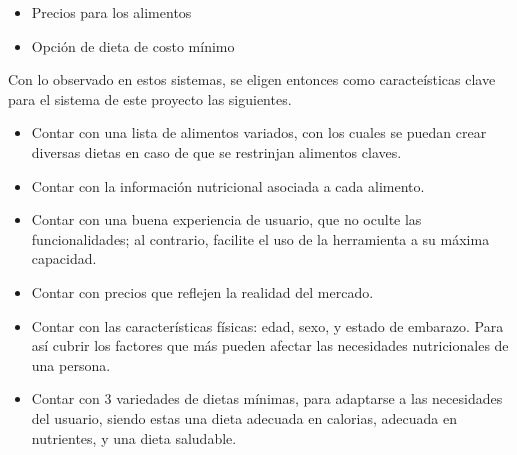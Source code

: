 \begin{itemize}
    \item Precios para los alimentos
    \item Opci\'on de dieta de costo m\'inimo
\end{itemize}

Con lo observado en estos sistemas, se eligen entonces como caracte\'isticas clave para el sistema de este proyecto las siguientes.

\begin{itemize}
    \item Contar con una lista de alimentos variados, con los cuales se puedan crear diversas dietas en caso de que se restrinjan alimentos claves.
    \item Contar con la informaci\'on nutricional asociada a cada alimento.
    \item Contar con una buena experiencia de usuario, que no oculte las funcionalidades; al contrario, facilite el uso de la herramienta a su m\'axima capacidad.
    \item Contar con precios que reflejen la realidad del mercado.
    \item Contar con las caracter\'isticas f\'isicas: edad, sexo, y estado de embarazo. Para as\'i cubrir los factores que m\'as pueden afectar las necesidades nutricionales de una persona.
    \item Contar con 3 variedades de dietas m\'inimas, para adaptarse a las necesidades del usuario, siendo estas una dieta adecuada en calorias, adecuada en nutrientes, y una dieta saludable.
\end{itemize}


